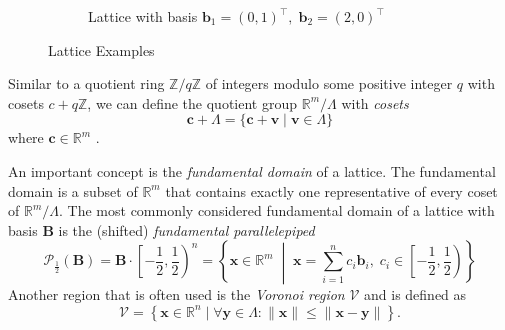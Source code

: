 \begin{figure}
\begin{subfigure}{0.5\textwidth}
        \caption{Lattice with basis $\mathbf{b}_1 = (0, 1)^\intercal,\; \mathbf{b}_2 = (2, 0)^\intercal$}
        \label{fig:lattice-b}
    \end{subfigure}
    \caption{Lattice Examples}\label{fig:lattice}
\end{figure}


Similar to a quotient ring $\mathbb{Z}/q\mathbb{Z}$ of integers modulo some positive integer $q$ with cosets $c + q\mathbb{Z}$, we can define the quotient group $\mathbb{R}^m/\Lambda$ with \textit{cosets}
\begin{equation}
    \mathbf{c} + \Lambda = \{\mathbf{c} + \mathbf{v} \mid \mathbf{v}\in \Lambda\}
\end{equation}
where $\mathbf{c} \in \mathbb{R}^m$ \cite{Pei16}. %

An important concept is the \textit{fundamental domain} of a lattice. The fundamental domain is a subset of $\mathbb{R}^m$ that contains exactly one representative of every coset of $\mathbb{R}^m/\Lambda$. The most commonly considered fundamental domain of a lattice with basis $\mathbf{B}$ is the (shifted) \textit{fundamental parallelepiped}
\begin{equation} \label{eq:fundamental-parallelepiped}
    \mathcal{P}_{\frac{1}{2}}(\mathbf{B}) = \mathbf{B} \cdot \left[ - \frac{1}{2}, \frac{1}{2}\right)^n = \left\{ \mathbf{x} \in \mathbb{R}^m \;\middle|\; \mathbf{x} = \sum_{i=1}^n c_i \mathbf{b}_i, \; c_i \in  \left[ - \frac{1}{2}, \frac{1}{2}\right) \right\}
\end{equation}
Another region that is often used is the \textit{Voronoi region} $\mathcal{V}$ \cite{GJS15} and is defined as
\begin{equation}\label{eq:voronoi-region}
    \mathcal{V} = \left\{ \mathbf{x} \in \mathbb{R}^n \mid \forall \mathbf{y} \in \Lambda : \| \mathbf{x} \| \leq \| \mathbf{x} - \mathbf{y} \| \right\}.
\end{equation}

